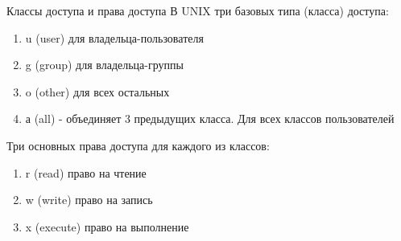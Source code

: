 \begin{frame}{Классы доступа и права доступа}
  В UNIX три базовых типа (класса) доступа:
  \begin{enumerate}
    \item \alert{u} (user) для владельца-пользователя
    \item \alert{g} (group) для владельца-группы         
    \item \alert{o} (other) для всех остальных \pause
    \item \alert{а} (all) - объединяет 3 предыдущих класса. Для всех классов пользователей
  \end{enumerate}
  \pause 
  Три основных права доступа для каждого из классов:
  \begin{enumerate}
    \item \alert{r} (read) право на чтение           
    \item \alert{w} (write) право на запись           
    \item \alert{x} (execute) право на выполнение  
  \end{enumerate}

\end{frame}
